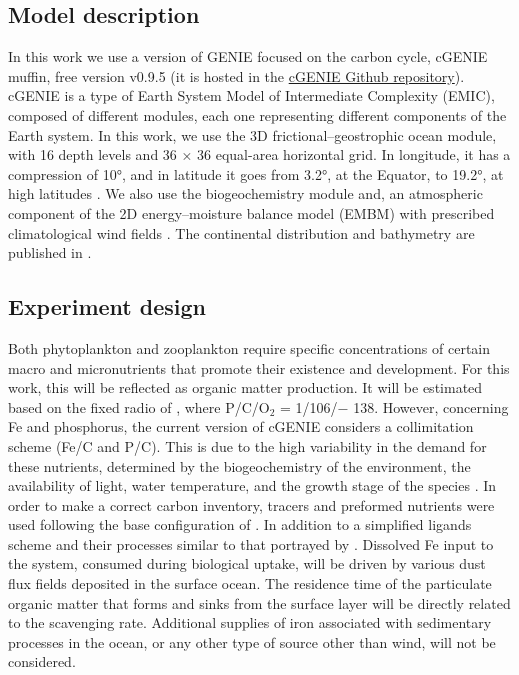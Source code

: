 

 \subsection{Model description}

\citep{van2021iron}

In this work we use a version of GENIE focused on the carbon cycle, cGENIE muffin, free version v0.9.5 (it is hosted in the \href{https://github.com/derpycode/cgenie.muffin}{cGENIE Github repository}). cGENIE is a type of Earth System Model of Intermediate Complexity (EMIC), composed of different modules, each one representing different components of the Earth system. In this work, we use the 3D frictional–geostrophic ocean module, with 16 depth levels and 36 × 36 equal-area horizontal grid. In longitude, it has a compression of 10°, and in latitude it goes from 3.2°, at the Equator, to 19.2°, at high latitudes \citep{edwards2005uncertainties}. We also use the biogeochemistry module \citep{ridgwell2007marine} and, an atmospheric component of the 2D energy–moisture balance model (EMBM) with prescribed climatological wind fields \citep{cao2009role}. The continental distribution and bathymetry are published in \cite{ridgwell2007marine}.\\

 \subsection{Experiment design}

Both phytoplankton and zooplankton require specific concentrations of certain macro and micronutrients that promote their existence and development. For this work, this will be reflected as organic matter production. It will be estimated based on the fixed radio of \cite{redfield1934proportions,redfield1963influence}, where P/C/O$_2$ = 1/106/$-$ 138. However, concerning Fe and phosphorus, the current version of cGENIE considers a collimitation scheme  (Fe/C and P/C). This is due to the high variability in the demand for these nutrients, determined by the biogeochemistry of the environment, the availability of light, water temperature, and the growth stage of the species . In order to make a correct carbon inventory, tracers and preformed nutrients were used following the base configuration of \cite{cao2009role}. In addition to a simplified ligands scheme and their processes similar to that portrayed by \cite{parekh2004modeling,parekh2006physical}. Dissolved Fe input to the system, consumed during biological uptake, will be driven by various dust flux fields deposited in the surface ocean. The residence time of the particulate organic matter that forms and sinks from the surface layer will be directly related to the scavenging rate. Additional supplies of iron associated with sedimentary processes in the ocean, or any other type of source other than wind, will not be considered. \\


